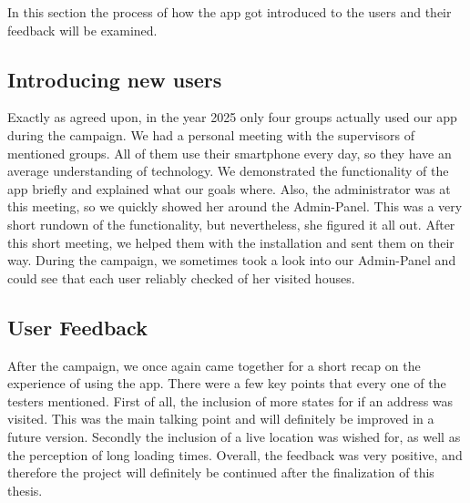 \Author{\daAuthorTwo}

In this section the process of how the app got introduced to the users and their feedback will be examined.

\blankLine

\subsection{Introducing new users}

Exactly as agreed upon, in the year 2025 only four groups actually used our app during the campaign. We had a personal meeting with the supervisors of mentioned groups. All of them use their smartphone every day, so they have an average understanding of technology. We demonstrated the functionality of the app briefly and explained what our goals where. Also, the administrator was at this meeting, so we quickly showed her around the Admin-Panel. This was a very short rundown of the functionality, but nevertheless, she figured it all out. After this short meeting, we helped them with the installation and sent them on their way. During the campaign, we sometimes took a look into our Admin-Panel and could see that each user reliably checked of her visited houses.  


\subsection{User Feedback}

After the campaign, we once again came together for a short recap on the experience of using the app. There were a few key points that every one of the testers mentioned. First of all, the inclusion of more states for if an address was visited. This was the main talking point and will definitely be improved in a future version. Secondly the inclusion of a live location was wished for, as well as the perception of long loading times. Overall, the feedback was very positive, and therefore the project will definitely be continued after the finalization of this thesis. 

\newpage